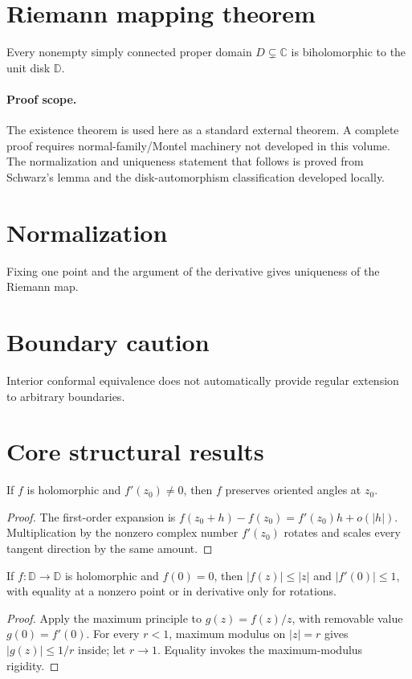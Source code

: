 \section{Riemann mapping theorem}
\begin{theorem}\label{thm:iv17-riemann-mapping}
Every nonempty simply connected proper domain $D\subsetneq\mathbb C$ is biholomorphic to the unit disk $\mathbb D$.
\end{theorem}
\paragraph{Proof scope.}
The existence theorem is used here as a standard external theorem. A complete proof requires normal-family/Montel machinery not developed in this volume. The normalization and uniqueness statement that follows is proved from Schwarz's lemma and the disk-automorphism classification developed locally.

\section{Normalization}
Fixing one point and the argument of the derivative gives uniqueness of the Riemann map.

\section{Boundary caution}
Interior conformal equivalence does not automatically provide regular extension to arbitrary boundaries.

\section{Core structural results}

\begin{theorem}\label{thm:iv17-01}
If $f$ is holomorphic and $f'(z_0)\ne0$, then $f$ preserves oriented angles at $z_0$.
\begin{proof}
The first-order expansion is $f(z_0+h)-f(z_0)=f'(z_0)h+o(|h|)$. Multiplication by the nonzero complex number $f'(z_0)$ rotates and scales every tangent direction by the same amount.
\end{proof}
\end{theorem}

\begin{theorem}\label{thm:iv17-02}
If $f:\mathbb D\to\mathbb D$ is holomorphic and $f(0)=0$, then $|f(z)|\le|z|$ and $|f'(0)|\le1$, with equality at a nonzero point or in derivative only for rotations.
\begin{proof}
Apply the maximum principle to $g(z)=f(z)/z$, with removable value $g(0)=f'(0)$. For every $r<1$, maximum modulus on $|z|=r$ gives $|g(z)|\le1/r$ inside; let $r\to1$. Equality invokes the maximum-modulus rigidity.
\end{proof}
\end{theorem}

